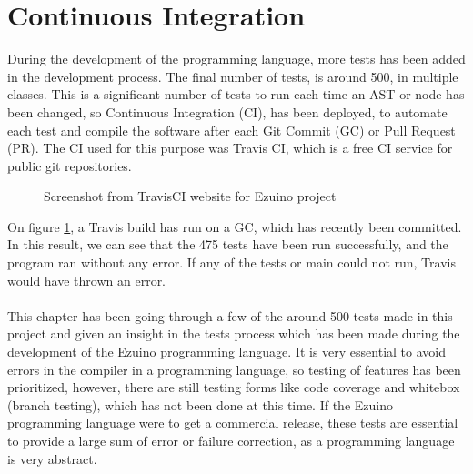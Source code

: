 \section{Continuous Integration}
During the development of the programming language, more tests has been added in the development process. The final number of tests, is around 500, in multiple classes. This is a significant number of tests to run each time an AST or node has been changed, so Continuous Integration (CI), has been deployed, to automate each test and compile the software after each Git Commit (GC) or Pull Request (PR).  The CI used for this purpose was Travis CI, which is a free CI service for public git repositories. \\
\begin{figure}[H]
\centering
{}
\caption{Screenshot from TravisCI website for Ezuino project}
\label{testa}
\end{figure}
On figure \ref{testa}, a Travis build has run on a GC, which has recently been committed. In this result, we can see that the 475 tests have been run successfully, and the program ran without any error. If any of the tests or main could not run, Travis would have thrown an error. \\
\\
This chapter has been going through a few of the around 500 tests made in this project and given an insight in the tests process which has been made during the development of the Ezuino programming language. It is very essential to avoid errors in the compiler in a programming language, so testing of features has been prioritized, however, there are still testing forms like code coverage and whitebox (branch testing), which has not been done at this time. If the Ezuino programming language were to get a commercial release, these tests are essential to provide a large sum of error or failure correction, as a programming language is very abstract. 

